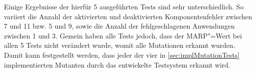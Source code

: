 Einige Ergebnisse der hierfür 5 ausgeführten Tests sind sehr unterschiedlich.
So variiert die Anzahl der aktivierten und deaktivierten Komponentenfehler zwischen 7 und 11 bzw. 5 und 9, sowie die Anzahl der fehlgeschlagenen Anwendungen zwischen 1 und 3.
Gemein haben alle Tests jedoch, dass der \gls{MARP}"=Wert bei allen 5 Tests nicht verändert wurde, womit alle Mutationen erkannt wurden.
Damit kann festgestellt werden, dass jeder der vier in \cref{sec:implMutationTests} implementierten Mutanten durch das entwickelte Testsystem erkannt wird.
